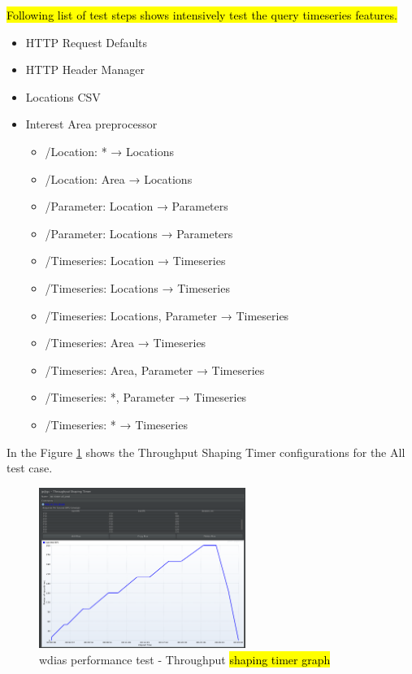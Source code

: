 \hl{Following list of test steps shows intensively test the query timeseries features.}

\begin{itemize}
    \item HTTP Request Defaults
    \item HTTP Header Manager
    \item Locations CSV
    \item Interest Area preprocessor
    \begin{itemize}
        \item /Location: * → Locations
    	\item /Location: Area → Locations
    	\item /Parameter: Location → Parameters
    	\item /Parameter: Locations → Parameters
    	\item /Timeseries: Location → Timeseries
    	\item /Timeseries: Locations → Timeseries
    	\item /Timeseries: Locations, Parameter → Timeseries
    	\item /Timeseries: Area → Timeseries
    	\item /Timeseries: Area, Parameter → Timeseries
    	\item /Timeseries: *, Parameter → Timeseries
    	\item /Timeseries: * → Timeseries
	\end{itemize}
\end{itemize}

In the Figure \ref{fi:test_prod_throughtput_shaping_timer} shows the Throughput Shaping Timer configurations for the All test case.

\begin{figure}[htp]
    \centering
    \includegraphics[width=0.6\textwidth]{results/work_load/test_prod_throughtput_shaping_timer.png}
    \caption{\acrshort{wdias} performance test - Throughput \hl{shaping timer graph}}
    \label{fi:test_prod_throughtput_shaping_timer}
\end{figure}

